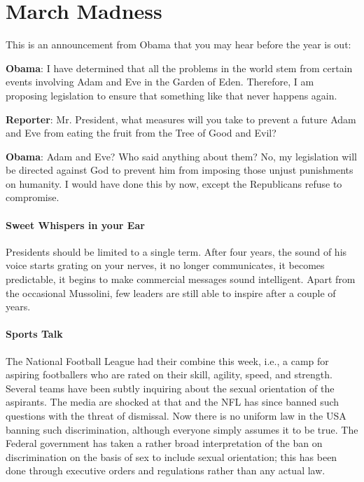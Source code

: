 \section{March Madness}

This is an announcement from Obama that you may hear before the year is out:

\textbf{Obama}: I have determined that all the problems in the world stem from certain events involving Adam and Eve in the Garden of Eden. Therefore, I am proposing legislation to ensure that something like that never happens again.

\textbf{Reporter}: Mr. President, what measures will you take to prevent a future Adam and Eve from eating the fruit from the Tree of Good and Evil?

\textbf{Obama}: Adam and Eve? Who said anything about them? No, my legislation will be directed against God to prevent him from imposing those unjust punishments on humanity. I would have done this by now, except the Republicans refuse to compromise.

\paragraph{Sweet Whispers in your Ear}


Presidents should be limited to a single term. After four years, the sound of his voice starts grating on your nerves, it no longer communicates, it becomes predictable, it begins to make commercial messages sound intelligent. Apart from the occasional Mussolini, few leaders are still able to inspire after a couple of years.

\paragraph{Sports Talk}


The National Football League had their combine this week, i.e., a camp for aspiring footballers who are rated on their skill, agility, speed, and strength. Several teams have been subtly inquiring about the sexual orientation of the aspirants. The media are shocked at that and the NFL has since banned such questions with the threat of dismissal. Now there is no uniform law in the USA banning such discrimination, although everyone simply assumes it to be true. The Federal government has taken a rather broad interpretation of the ban on discrimination on the basis of sex to include sexual orientation; this has been done through executive orders and regulations rather than any actual law.

